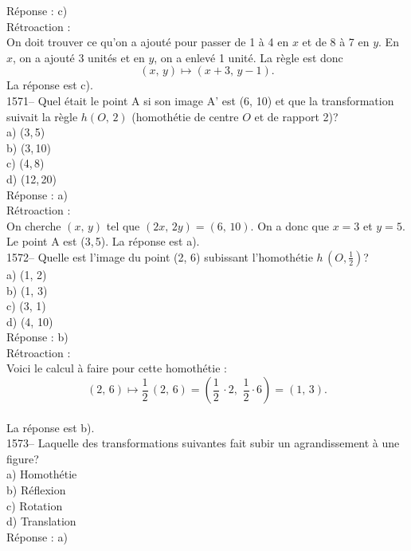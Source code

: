 R\'eponse : c)\\

R\'etroaction :\\
On doit trouver ce qu'on a ajout\'e pour passer de 1 \`a 4 en $x$ et
de 8 \`a 7 en $y$. En $x$, on a ajout\'e 3 unit\'es et en $y$, on a
enlev\'e 1 unit\'e. La r\`egle est donc
$$(x,\,y)\mapsto(x+3,\,y-1).$$ La r\'eponse est c).\\

1571-- Quel \'etait le point A si son image A' est (6, 10) et que la
transformation suivait la r\`egle $h$$(O ,\,2)$ (homoth\'etie de
centre
$O$ et de rapport 2)?\\
a) (3,\,5)\\
b) (3,\,10) \\
c) (4,\,8)\\
d) (12,\,20)\\

R\'eponse : a)\\

R\'etroaction :\\
On cherche $(x,\,y)$ tel que $(2x,\,2y)=(6,\,10)$. On a donc que
$x=3$
et $y=5$. Le point A est (3,\,5). La r\'eponse est a).\\

1572-- Quelle est l'image du point (2, 6) subissant l'homoth\'etie
$h$$\,(O ,\frac{1}{2})$?\\
a) (1, 2)\\
b) (1, 3)\\
c) (3, 1)\\
d) (4, 10)\\

R\'eponse : b) \\

R\'etroaction :\\
Voici le calcul \`a faire pour cette homoth\'etie :$$(2,\,6)\mapsto
\frac{1}{2}\,(2,\,6)=(\frac{1}{2}\,\cdot 2,\,\,\frac{1}{2}\cdot
6)=(1,\,3).$$\\
La r\'eponse est b).\\

1573-- Laquelle des transformations suivantes fait subir un
agrandissement \`a
une figure?\\
a) Homoth\'etie\\
b) R\'eflexion\\
c) Rotation\\
d) Translation \\

R\'eponse : a)\\

